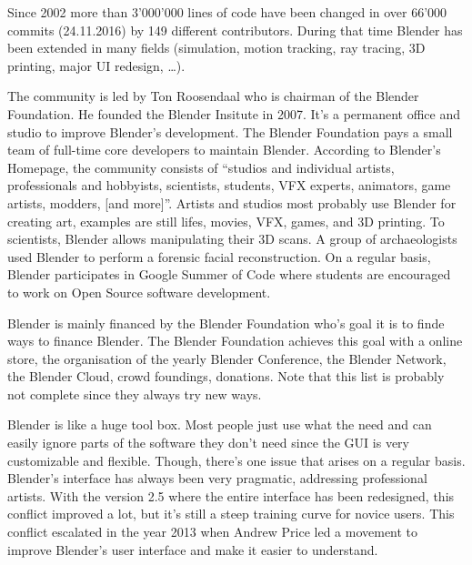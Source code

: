 Since 2002 more than 3'000'000 lines of code have been changed in over 66'000 commits (24.11.2016) by 149 different contributors. 
During that time Blender has been extended in many fields (simulation, motion tracking, ray tracing, 3D printing, major UI redesign, …). 
\par
The community is led by Ton Roosendaal who is chairman of the Blender Foundation. 
He founded the Blender Insitute in 2007. 
It's a permanent office and studio to improve Blender's development.\cite{blender-foundation-history}
The Blender Foundation pays a small team of full-time core developers to maintain Blender.\cite{blender-development-support} 
According to Blender's Homepage\cite{blender-homepage}, the community consists of ``studios and individual artists, professionals and hobbyists, scientists, students, VFX experts, animators, game artists, modders, [and more]''.
Artists and studios most probably use Blender for creating art, examples are still lifes, movies, VFX, games, and 3D printing.
To scientists, Blender allows manipulating their 3D scans. 
A group of archaeologists used Blender to perform a forensic facial reconstruction.\cite{blender-facial-reconstruction}
On a regular basis, Blender participates in Google Summer of Code where students are encouraged to work on Open Source software development.\cite{blender-gsoc-2016}
\par
Blender is mainly financed by the Blender Foundation who's goal it is to finde ways to finance Blender.
The Blender Foundation achieves this goal with a online store\cite{blender-estore}, the organisation of the yearly Blender Conference\cite{blender-conference}, the Blender Network\cite{blender-network}, the Blender Cloud\cite{blender-cloud}, crowd foundings, donations\cite{blender-donate}. 
Note that this list is probably not complete since they always try new ways.
\par
Blender is like a huge tool box. 
Most people just use what the need and can easily ignore parts of the software they don't need since the GUI is very customizable and flexible. 
Though, there's one issue that arises on a regular basis. 
Blender's interface has always been very pragmatic, addressing professional artists. 
With the version 2.5 where the entire interface has been redesigned, this conflict improved a lot, but it's still a steep training curve for novice users. 
This conflict escalated in the year 2013 when Andrew Price led a movement to improve Blender's user interface and make it easier to understand.\cite{blender-guru-ui} 
